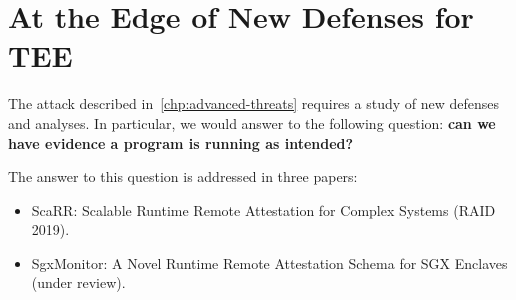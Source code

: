 \chapter{At the Edge of New Defenses for TEE} %
\label{chp:runtime-protection} 

The attack described in~\ref{chp:advanced-threats} requires a study of new
defenses and analyses. In particular, we would answer to the following 
question: \textbf{can we have evidence a program is running as intended?}

The answer to this question is addressed in three papers:
\begin{itemize}
	\item ScaRR: Scalable Runtime Remote Attestation for Complex Systems (RAID 
	2019).
	\item SgxMonitor: A Novel Runtime Remote Attestation Schema for SGX 
	Enclaves (under review).
\end{itemize}
